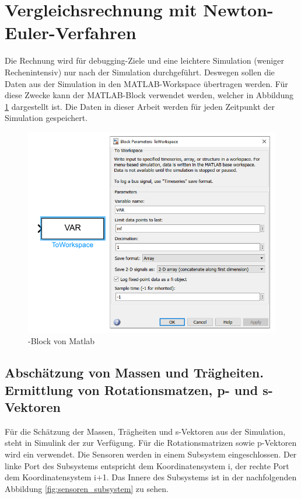 \section{Vergleichsrechnung mit Newton-Euler-Verfahren}

Die Rechnung wird für debugging-Ziele und eine leichtere Simulation (weniger Rechenintensiv) nur nach der Simulation durchgeführt. 
Deswegen sollen die Daten aus der Simulation in den MATLAB-Workspace übertragen werden. 
Für diese Zwecke kann der  MATLAB-Block verwendet werden, welcher in Abbildung \ref{fig:simulink_to_workspace} dargestellt ist.
Die Daten in dieser Arbeit werden für jeden Zeitpunkt der Simulation gespeichert.

\begin{figure}[!htbp]
	\centering
	\includegraphics[width=0.59\linewidth]{grafic/to_workspace_block}
	\caption{-Block von Matlab}
	\label{fig:simulink_to_workspace}
\end{figure}


\subsection{Abschätzung von Massen und Trägheiten. Ermittlung von Rotationsmatzen, p- und s-Vektoren}

Für die Schätzung der Massen, Trägheiten und s-Vektoren aus der Simulation, steht in Simulink  der  zur Verfügung.
Für die Rotationsmatrizen sowie p-Vektoren wird ein  verwendet.
Die Sensoren werden in einem Subsystem eingeschlossen. 
Der linke Port des Subsystems entspricht dem Koordinatensystem i, der rechte Port dem Koordinatensystem i+1.
Das Innere des Subsystems ist in der nachfolgenden Abbildung \ref{fig:sensoren_subsystem} zu sehen.

